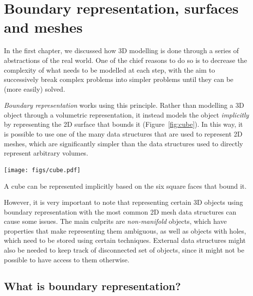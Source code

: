 
\setchapterpreamble[u]{\margintoc}

\graphicspath{{brep/}}

\chapter{Boundary representation, surfaces and meshes}%
\label{chap:brep}

In the first chapter, we discussed how 3D modelling is done through a series of abstractions of the real world.
One of the chief reasons to do so is to decrease the complexity of what needs to be modelled at each step, with the aim to successively break complex problems into simpler problems until they can be (more easily) solved.

\emph{Boundary representation} works using this principle.
Rather than modelling a 3D object through a volumetric representation, it instead models the object \emph{implicitly} by representing the 2D surface that bounds it (Figure~\ref{fig:cube}).
In this way, it is possible to use one of the many data structures that are used to represent 2D meshes, which are significantly simpler than the data structures used to directly represent arbitrary volumes.

\begin{marginfigure}
\centering
\texttt{[image: figs/cube.pdf]}
\caption[A cube represented implicitly based on the six square faces that bound it]{A cube can be represented implicitly based on the six square faces that bound it.}%
\label{fig:cube}
\end{marginfigure}

However, it is very important to note that representing certain 3D objects using boundary representation with the most common 2D mesh data structures can cause some issues.
The main culprits are \emph{non-manifold} objects, which have properties that make representing them ambiguous, as well as objects with holes, which need to be stored using certain techniques.
External data structures might also be needed to keep track of disconnected set of objects, since it might not be possible to have access to them otherwise.

\section{What is boundary representation?}

